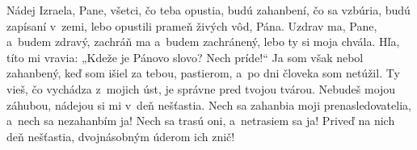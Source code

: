 Nádej Izraela, Pane,
všetci, čo teba opustia, budú zahanbení,
čo sa vzbúria, budú zapísaní v~zemi,
lebo opustili prameň živých vôd, Pána.
Uzdrav ma, Pane, a~budem zdravý,
zachráň ma a~budem zachránený,
lebo ty si moja chvála.
Hľa, títo mi vravia:
„Kdeže je Pánovo slovo? Nech príde!“
Ja som však nebol zahanbený,
keď som išiel za tebou, pastierom,
a~po dni človeka som netúžil.
Ty vieš, čo vychádza z~mojich úst,
je správne pred tvojou tvárou.
Nebudeš mojou záhubou,
nádejou si mi v~deň nešťastia.
Nech sa zahanbia moji prenasledovatelia,
a~nech sa nezahanbím ja!
Nech sa trasú oni, a~netrasiem sa ja!
Priveď na nich deň nešťastia,
dvojnásobným úderom ich znič!

